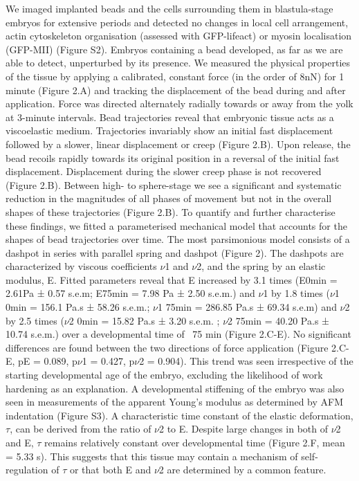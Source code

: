 We imaged implanted beads and the cells surrounding them in blastula-stage embryos for extensive periods and detected no changes in local cell arrangement, actin cytoskeleton organisation (assessed with GFP-lifeact) or myosin localisation (GFP-MII) (Figure S2). Embryos containing a bead developed, as far as we are able to detect, unperturbed by its presence.
We measured the physical properties of the tissue by applying a calibrated, constant force (in the order of 8nN) for 1 minute (Figure 2.A) and tracking the displacement of the bead during and after application. Force was directed alternately radially towards or away from the yolk at 3-minute intervals.
Bead trajectories reveal that embryonic tissue acts as a viscoelastic medium.
Trajectories invariably show an initial fast displacement followed by a slower, linear displacement or creep (Figure 2.B).
Upon release, the bead recoils rapidly towards its original position in a reversal of the initial fast displacement.
Displacement during the slower creep phase is not recovered (Figure 2.B). Between high- to sphere-stage we see a significant and systematic reduction in the magnitudes of all phases of movement but not in the overall shapes of these trajectories (Figure 2.B).
To quantify and further characterise these findings, we fitted a parameterised mechanical model that accounts for the shapes of bead trajectories over time.
The most parsimonious model consists of a dashpot in series with parallel spring and dashpot (Figure 2).
The dashpots are characterized by viscous coefficients $\nu$1 and $\nu$2, and the spring by an elastic modulus, E. Fitted parameters reveal that E increased by 3.1 times (E0min = 2.61Pa ± 0.57 s.e.m; E75min = 7.98 Pa ± 2.50 s.e.m.) and $\nu$1 by 1.8 times ($\nu$1 0min = 156.1 Pa.s ± 58.26 s.e.m.; $\nu$1 75min = 286.85  Pa.s ± 69.34 s.e.m) and $\nu$2 by 2.5 times ($\nu$2 0min = 15.82 Pa.s ± 3.20 s.e.m. ; $\nu$2 75min = 40.20 Pa.s ± 10.74 s.e.m.) over a developmental time of  ~75 min (Figure 2.C-E).
 No significant differences are found between the two directions of force application (Figure 2.C-E, pE = 0.089, p$\nu$1 = 0.427, p$\nu$2 = 0.904).
 This trend was seen irrespective of the starting developmental age of the embryo, excluding the likelihood of work hardening as an explanation.
 A developmental stiffening of the embryo was also seen in measurements of the apparent Young’s modulus as determined by AFM indentation (Figure S3).
 A characteristic time constant of the elastic deformation, $\tau$, can be derived from the ratio of $\nu$2 to E. Despite large changes in both of $\nu$2 and E, $\tau$ remains relatively constant over developmental time (Figure 2.F, mean = 5.33 s).
 This suggests that this tissue may contain a mechanism of self-regulation of $\tau$ or that both E and $\nu$2 are determined by a common feature.

